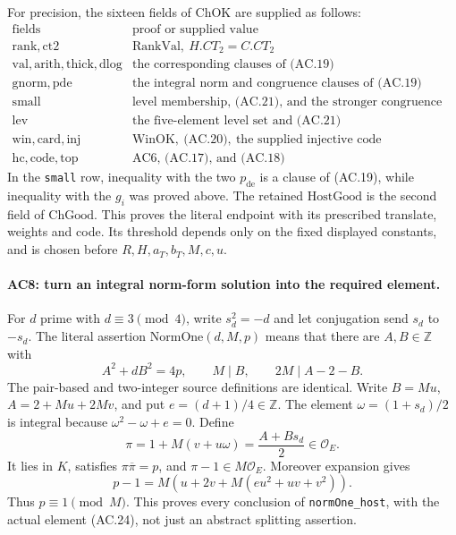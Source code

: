 For precision, the sixteen fields of $\mathrm{ChOK}$ are supplied as
follows:
\[
\begin{array}{c|l}
\text{fields}&\text{proof or supplied value}\\ \hline
\mathrm{rank},\mathrm{ct2}&\mathrm{RankVal},\ H.CT_2=C.CT_2\\
\mathrm{val},\mathrm{arith},\mathrm{thick},\mathrm{dlog}
      &\text{the corresponding clauses of (AC.19)}\\
\mathrm{gnorm},\mathrm{pde}&\text{the integral norm and congruence clauses of (AC.19)}\\
\mathrm{small}&\text{level membership, (AC.21), and the stronger congruence above}\\
\mathrm{lev}&\text{the five-element level set and (AC.21)}\\
\mathrm{win},\mathrm{card},\mathrm{inj}
      &\mathrm{WinOK},\ \text{(AC.20)},\ \text{the supplied injective code}\\
\mathrm{hc},\mathrm{code},\mathrm{top}&\text{AC6, (AC.17), and (AC.18)}
\end{array}                                                   \tag{AC.22}
\]
In the \texttt{small} row, inequality with the two $p_{\mathrm{de}}$
is a clause of (AC.19), while inequality with the $g_i$ was proved
above. The retained $\mathrm{HostGood}$ is the second field of
$\mathrm{ChGood}$. This proves the literal endpoint with its
prescribed translate, weights and code. Its threshold depends only
on the fixed displayed constants, and is chosen before $R,H,a_T,b_T,M,c,u$.

\paragraph{AC8: turn an integral norm-form solution into the required element.}
For $d$ prime with $d\equiv3\pmod4$, write $s_d^2=-d$ and let
conjugation send $s_d$ to $-s_d$. The literal assertion
$\mathrm{NormOne}(d,M,p)$ means that there are $A,B\in\mathbb Z$
with
\[
 A^2+dB^2=4p,\qquad M\mid B,\qquad 2M\mid A-2-B.
                                                               \tag{AC.23}
\]
The pair-based and two-integer source definitions are identical.
Write $B=M u$, $A=2+Mu+2Mv$, and put $e=(d+1)/4\in\mathbb Z$.
The element $\omega=(1+s_d)/2$ is integral because
$\omega^2-\omega+e=0$. Define
\[
       \pi=1+M(v+u\omega)=\frac{A+B s_d}{2}\in\mathcal O_E.
                                                               \tag{AC.24}
\]
It lies in $K$, satisfies $\pi\overline\pi=p$, and
$\pi-1\in M\mathcal O_E$. Moreover expansion gives
\[
     p-1=M\left(u+2v+M(eu^2+uv+v^2)\right).
                                                               \tag{AC.25}
\]
Thus $p\equiv1\pmod M$. This proves every conclusion of
\texttt{normOne\_host}, with the actual element (AC.24), not just
an abstract splitting assertion.

